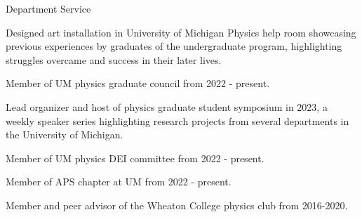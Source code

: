 \documentclass{resume} %
\begin{document}

\begin{rSection}{Department Service}
    \begin{itemize}
        \item Designed art installation in University of Michigan Physics help room showcasing previous experiences by graduates of the undergraduate program, highlighting struggles overcame and success in their later lives.
        \item{Member of UM physics graduate council from 2022 - present. 
        \item Lead organizer and host of physics graduate student symposium in 2023, a weekly speaker series highlighting research projects from several departments in the University of Michigan.}
    \item{Member of UM physics DEI committee from 2022 - present. }
    \item Member of APS chapter at UM from 2022 - present.
    \item Member and peer advisor of the Wheaton College physics club from 2016-2020.
    \end{itemize}
    \end{rSection}
    
                

\end{document}
